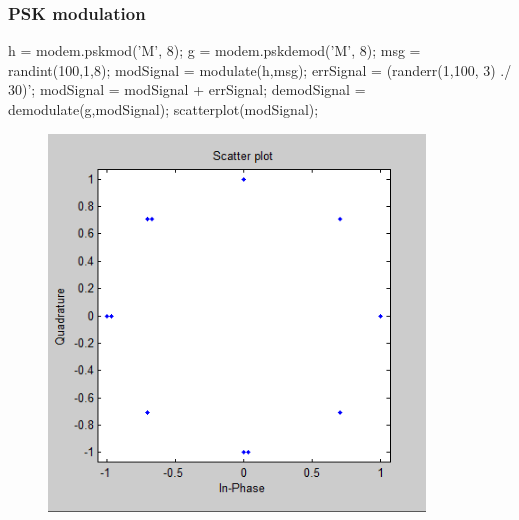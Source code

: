 \documentclass[10pt,a4paper]{article}
\begin{document}
\subsubsection{PSK modulation}
h = modem.pskmod('M', 8); \newline
g = modem.pskdemod('M', 8); \newline
msg = randint(100,1,8); \newline
modSignal = modulate(h,msg); \newline
errSignal = (randerr(1,100, 3) ./ 30)'; \newline
modSignal = modSignal + errSignal; \newline
demodSignal = demodulate(g,modSignal); \newline
scatterplot(modSignal);\newline
\begin{figure}[h]
\centering
\includegraphics[width=10cm]{1_2.png} 
\end{figure}
\newpage
\FloatBarrier
\end{document}
